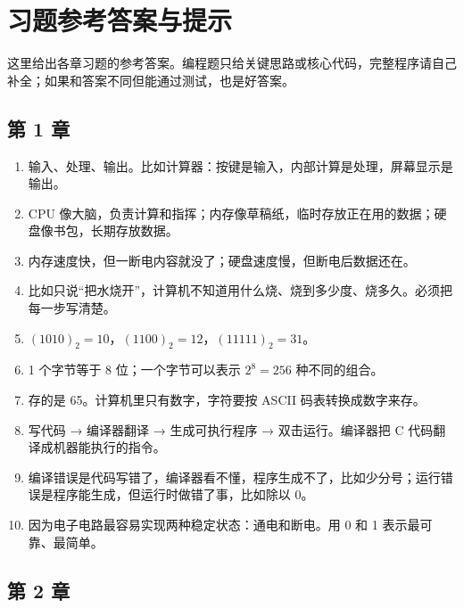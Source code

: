 \chapter{习题参考答案与提示}
\label{app:answers}

这里给出各章习题的参考答案。编程题只给关键思路或核心代码，完整程序请自己补全；如果和答案不同但能通过测试，也是好答案。

\section{第 1 章}

\begin{enumerate}
  \item 输入、处理、输出。比如计算器：按键是输入，内部计算是处理，屏幕显示是输出。
  \item CPU 像大脑，负责计算和指挥；内存像草稿纸，临时存放正在用的数据；硬盘像书包，长期存放数据。
  \item 内存速度快，但一断电内容就没了；硬盘速度慢，但断电后数据还在。
  \item 比如只说“把水烧开”，计算机不知道用什么烧、烧到多少度、烧多久。必须把每一步写清楚。
  \item $(1010)_2=10$，$(1100)_2=12$，$(11111)_2=31$。
  \item 1 个字节等于 8 位；一个字节可以表示 $2^8=256$ 种不同的组合。
  \item 存的是 65。计算机里只有数字，字符要按 ASCII 码表转换成数字来存。
  \item 写代码 → 编译器翻译 → 生成可执行程序 → 双击运行。编译器把 C 代码翻译成机器能执行的指令。
  \item 编译错误是代码写错了，编译器看不懂，程序生成不了，比如少分号；运行错误是程序能生成，但运行时做错了事，比如除以 0。
  \item 因为电子电路最容易实现两种稳定状态：通电和断电。用 0 和 1 表示最可靠、最简单。
\end{enumerate}

\section{第 2 章}

